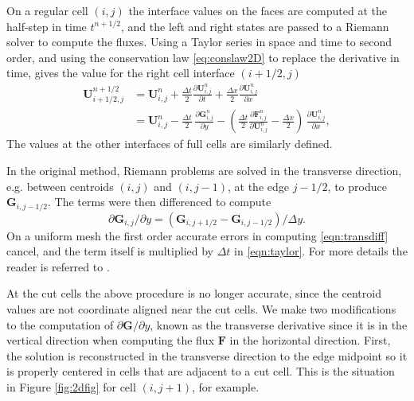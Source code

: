 On a regular cell $(i,j)$ the interface values on the 
faces are computed at the half-step in time $t^{n+1/2}$, and the left and right states
are passed to a Riemann
solver to compute the fluxes.
Using a Taylor series in space and time to second order,
and using the conservation law \eqref{eq:conslaw2D}  to replace the derivative in time, gives the value for the right cell
interface $(i+1/2,j)$ 
\begin{subequations}
\begin{align}
\label{eqn:taylor}
\mathbf{U}_{i+1/2,j}^{n+1/2}    
              &= \mathbf{U}_{i,j}^n +  
\frac{\Delta t}{2} \frac{\partial \mathbf{U}_{i,j}^n}{\partial t} + 
\frac{\Delta x}{2} \frac{\partial \mathbf{U}_{i,j}^n}{\partial x} \\[.08in]
              &= \mathbf{U}_{i,j}^n - \frac{\Delta t}{2} \, 
             \frac{\partial \mathbf{G}_{i,j}^n}{\partial y}  -
            \left( \frac{\Delta t}{2} 
            \frac{\partial \mathbf{F}_{i,j}^n}{\partial \mathbf{U}^n_{i,j}} -
             \frac{\Delta x}{2} \right) \,\frac{\partial \mathbf{U}_{i,j}^n}{\partial x}, 
\end{align}
\end{subequations}
The values at the other interfaces of full cells are similarly defined.


In the original method,
Riemann problems are solved in the transverse direction, e.g. between
centroids $(i,j)$ and $(i,j-1)$, at the edge $j-1/2$, to produce
$\mathbf{G}_{i,j-1/2}$. 
The terms were then differenced to compute 
\begin{equation}
\partial \mathbf{G}_{i,j}/\partial y =  (\mathbf{G}_{i,j+1/2} - \mathbf{G}_{i,j-1/2})/\Delta y .
\label{eqn:transdiff}
\end{equation}
On a uniform mesh 
the first order accurate errors in computing \eqref{eqn:transdiff} 
cancel, and the term itself is 
multiplied by $\Delta t$ in \eqref{eqn:taylor}.
For more details the reader is referred to \cite{Colella:Unsplit}.

At the cut cells the above procedure is no longer accurate,
since  the centroid values are not coordinate aligned near
the cut cells.
We make two modifications to the
computation of $\partial \mathbf{G}/\partial y$, known as the
transverse derivative since it is in the vertical direction
when computing the flux $\mathbf{F}$ in the horizontal direction.
First,
the solution is reconstructed in the transverse direction
to the edge midpoint so it is properly centered in cells that
are adjacent to a cut cell.  This is the situation
in Figure \ref{fig:2dfig} for cell $(i,j+1)$, for example.

